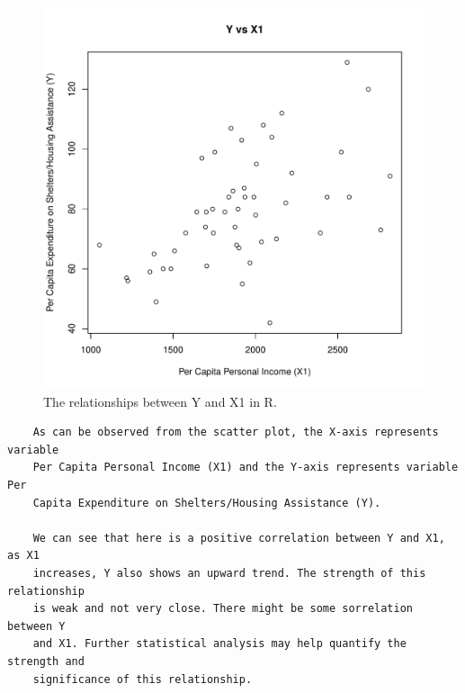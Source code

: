 \documentclass[12pt,letterpaper]{article}
\begin{document}
\begin{itemize}
	  

	\begin{figure}[h!]\centering
	\caption{\footnotesize The relationships between Y and X1 in R.}
	\label{fig:plot_3}
	\includegraphics[width=.85\textwidth]{Problem2_Question3_Plot_Y_vs_X1.pdf}
	\end{figure}

	\begin{verbatim}
	As can be observed from the scatter plot, the X-axis represents variable 
	Per Capita Personal Income (X1) and the Y-axis represents variable Per 
	Capita Expenditure on Shelters/Housing Assistance (Y). 
	
	We can see that here is a positive correlation between Y and X1, as X1 
	increases, Y also shows an upward trend. The strength of this relationship 
	is weak and not very close. There might be some sorrelation between Y 
	and X1. Further statistical analysis may help quantify the strength and 
	significance of this relationship.
	\end{verbatim}

	  


\end{itemize}
\end{document}
